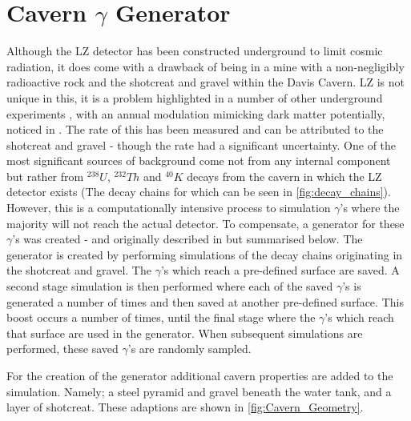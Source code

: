 \section{Cavern $\gamma$ Generator}
\label{sec:cavern_gamma_generator}

\par
Although the LZ detector has been constructed underground to limit cosmic radiation, it does come with a drawback of being in a mine with a non-negligibly radioactive rock and the shotcreat and gravel within the Davis Cavern.
LZ is not unique in this, it is a problem highlighted in a number of other underground experiments \cite{cavern_gamma_annual_modulation_CoGeNT_ref, cavern_gammas_in_Soudan_mine_ref}, with an annual modulation mimicking dark matter potentially, noticed in \cite{cavern_gamma_annual_modulation_CoGeNT_ref}.
The rate of this has been measured and can be attributed to the shotcreat and gravel \cite{LZ_Gamma_Ray_Background_ref} - though the rate had a significant uncertainty.
One of the most significant sources of background come not from any internal component but rather from $^{238}U$, $^{232}Th$ and $^{40}K$ decays from the cavern in which the LZ detector exists (The decay chains for which can be seen in \autoref{fig:decay_chains}).
However, this is a computationally intensive process to simulation $\gamma$'s where the majority will not reach the actual detector.
To compensate, a generator for these $\gamma$'s was created - and originally described in \cite{rg_generator_ref} but summarised below.
The generator is created by performing simulations of the decay chains originating in the shotcreat and gravel.
The $\gamma$'s which reach a pre-defined surface are saved.
A second stage simulation is then performed where each of the saved $\gamma$'s is generated a number of times and then saved at another pre-defined surface.
This boost occurs a number of times, until the final stage where the $\gamma$'s which reach that surface are used in the generator.
When subsequent simulations are performed, these saved $\gamma$'s are randomly sampled. 

\par
For the creation of the generator additional cavern properties are added to the simulation.
Namely; a steel pyramid and gravel beneath the water tank, and a layer of shotcreat.
These adaptions are shown in \autoref{fig:Cavern_Geometry}.

